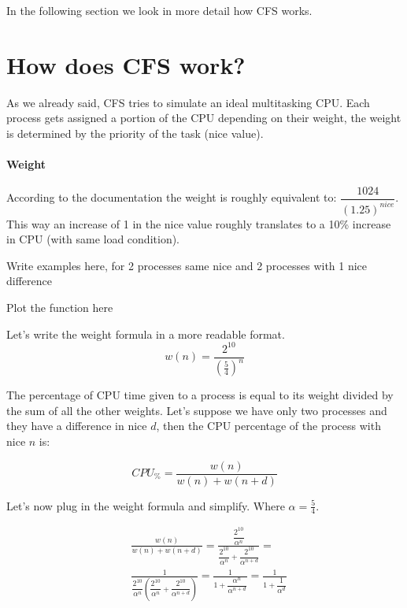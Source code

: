 \documentclass[10pt]{book}
\begin{document}
In the following section we look in more detail how CFS works.

\section{How does CFS work?} 

As we already said, CFS tries to simulate an ideal multitasking CPU. Each process gets assigned a portion of the CPU depending on their weight, the weight is determined by the priority of the task (nice value).

\paragraph{Weight}
According to the documentation the weight is roughly equivalent to: $\dfrac{1024}{(1.25)^{nice}}$. This way an increase of 1 in the nice value roughly translates to a 10\% increase in CPU (with same load condition).%

Write examples here, for 2 processes same nice and 2 processes with 1 nice difference

Plot the function here

Let's write the weight formula in a more readable format.
\begin{equation}
    w(n) = \frac{2^{10}}{(\frac{5}{4})^{n}}
\end{equation}

The percentage of CPU time given to a process is equal to its weight divided by the sum of all the other weights. Let's suppose we have only two processes and they have a difference in nice $d$, then the CPU percentage of the process with nice $n$ is:

\begin{equation}
    CPU_\% = \frac{w(n)}{w(n)+w(n+d)}
\end{equation}

Let's now plug in the weight formula and simplify. Where $\alpha=\frac{5}{4}$. 

\begin{align*}
    &\frac{w(n)}{w(n)+w(n+d)} =
    \frac{\dfrac{2^{10}}{\alpha^{n}}}{\dfrac{2^{10}}{\alpha^{n}}+\dfrac{2^{10}}{\alpha^{n+d}}} =\\
    &\frac{1}{\dfrac{2^{10}}{\alpha^{n}} \left(\dfrac{2^{10}}{\alpha^{n}}+\dfrac{2^{10}}{\alpha^{n+d}}\right)} =
    \frac{1}{1+\dfrac{\alpha^{n}}{\alpha^{n+d}}} =
    \frac{1}{1+\dfrac{1}{\alpha^{d}}}
\end{align*}
\end{document}
